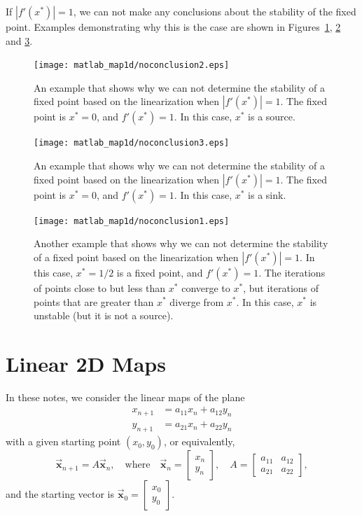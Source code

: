 \documentclass{book}
\newcommand{\BX}{\vec{\textbf{x}}}
\newcommand{\ds}{\displaystyle}
\begin{document}
\bigskip
If $|f'(x^*)|=1$, we can not make any conclusions about the
stability of the fixed point.  Examples demonstrating why this
is the case are shown in Figures~\ref{fig:noconclusion2},
\ref{fig:noconclusion3}
and \ref{fig:noconclusion1}.
%
\begin{figure}
\centerline{%
\texttt{[image: matlab\_map1d/noconclusion2.eps]}%
}
\caption{An example that shows why we can not determine
the stability of a fixed point based on the linearization
when
$|f'(x^*)|=1$.  The fixed point is $x^*=0$, and $f'(x^*)=1$.
In this case, $x^*$ is a source.}
\label{fig:noconclusion2}
\end{figure}
%
\begin{figure}
\centerline{%
\texttt{[image: matlab\_map1d/noconclusion3.eps]}%
}
\caption{An example that shows why we can not determine
the stability of a fixed point based on the linearization
when
$|f'(x^*)|=1$.  The fixed point is $x^*=0$, and $f'(x^*)=1$.
In this case, $x^*$ is a sink.}
\label{fig:noconclusion3}
\end{figure}
%
\begin{figure}
\centerline{%
\texttt{[image: matlab\_map1d/noconclusion1.eps]}%
}
\caption{Another example that shows why we can not determine
the stability of a fixed point based on the linearization
when
$|f'(x^*)|=1$.  In this case, $x^*=1/2$ is a fixed point,
and $f'(x^*)=1$.
The iterations of points close to but less than $x^*$
converge to $x^*$, but iterations of points that are
greater than $x^*$ diverge from $x^*$.
In this case, $x^*$ is unstable (but it is not a source).
}
\label{fig:noconclusion1}
\end{figure}

%
%
\section{Linear 2D Maps}

In these notes, we consider the linear maps of the plane
\begin{equation}
\begin{split}
  x_{n+1} & = a_{11}x_n + a_{12}y_n \\
  y_{n+1} & = a_{21}x_n + a_{22}y_n
\end{split}
\end{equation}
with a given starting point $(x_0,y_0)$,
or equivalently,
\begin{equation}
  \BX_{n+1} = A\BX_n, \quad \textrm{where} \quad
     \BX_n = \begin{bmatrix} x_n \\ y_n \end{bmatrix},
     \quad
     A = \begin{bmatrix} a_{11} & a_{12} \\ a_{21} & a_{22} \end{bmatrix},
\label{eqn:linearmap}
\end{equation}
and the starting vector is
$\ds \BX_0 = \begin{bmatrix} x_0 \\ y_0 \end{bmatrix}$.
%
%
\end{document}
